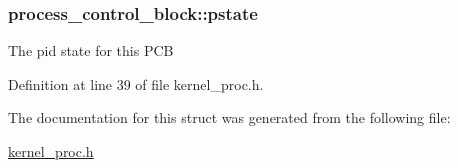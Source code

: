 \subsubsection[{\texorpdfstring{pstate}{pstate}}]{ process\+\_\+control\+\_\+block\+::pstate}\hypertarget{structprocess__control__block_ae3334dd8a5747f108124c7129c27eea5}{}\label{structprocess__control__block_ae3334dd8a5747f108124c7129c27eea5}
The pid state for this P\+CB 

Definition at line 39 of file kernel\+\_\+proc.\+h.



The documentation for this struct was generated from the following file\+:\begin{DoxyCompactItemize}
\item 
\hyperlink{kernel__proc_8h}{kernel\+\_\+proc.\+h}\end{DoxyCompactItemize}
